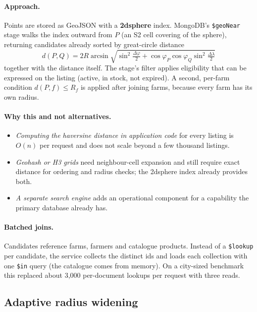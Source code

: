 \documentclass[11pt,a4paper]{article}
\begin{document}
\paragraph{Approach.} Points are stored as GeoJSON with a \textbf{2dsphere} index. MongoDB's \texttt{\$geoNear} stage walks the index outward from $P$ (an S2 cell covering of the sphere), returning candidates already sorted by great-circle distance
\[
  d(P,Q) = 2R\arcsin\sqrt{\sin^2\tfrac{\Delta\varphi}{2} + \cos\varphi_P\cos\varphi_Q\sin^2\tfrac{\Delta\lambda}{2}}
\]
together with the distance itself. The stage's filter applies eligibility that can be expressed on the listing (active, in stock, not expired). A second, per-farm condition $d(P,f) \le R_f$ is applied after joining farms, because every farm has its own radius.

\paragraph{Why this and not alternatives.}
\begin{itemize}
  \item \emph{Computing the haversine distance in application code} for every listing is $O(n)$ per request and does not scale beyond a few thousand listings.
  \item \emph{Geohash or H3 grids} need neighbour-cell expansion and still require exact distance for ordering and radius checks; the 2dsphere index already provides both.
  \item \emph{A separate search engine} adds an operational component for a capability the primary database already has.
\end{itemize}

\paragraph{Batched joins.} Candidates reference farms, farmers and catalogue products. Instead of a \texttt{\$lookup} per candidate, the service collects the distinct ids and loads each collection with one \texttt{\$in} query (the catalogue comes from memory). On a city-sized benchmark this replaced about 3{,}000 per-document lookups per request with three reads.

\subsection{Adaptive radius widening}
\end{document}
